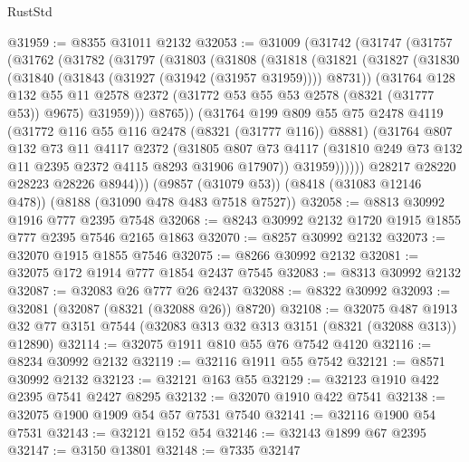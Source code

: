 \begin{lexlean}{RustStd}
\begin{coremodule}
@31959 := @8355 @31011 @2132
@32053 := @31009
    (@31742
      (@31747
        (@31757
          (@31762
            (@31782
              (@31797
                (@31803
                  (@31808
                    (@31818
                      (@31821
                        (@31827
                          (@31830 (@31840 (@31843 (@31927 (@31942 (@31957 @31959)))) @8731))
                          (@31764
                            @128
                            @132
                            @55
                            @11
                            @2578
                            @2372
                            (@31772 @53 @55 @53 @2578 (@8321 (@31777 @53)) @9675)
                            @31959)))
                      @8765))
                  (@31764
                    @199
                    @809
                    @55
                    @75
                    @2478
                    @4119
                    (@31772 @116 @55 @116 @2478 (@8321 (@31777 @116)) @8881)
                    (@31764
                      @807
                      @132
                      @73
                      @11
                      @4117
                      @2372
                      (@31805
                        @807
                        @73
                        @4117
                        (@31810 @249 @73 @132 @11 @2395 @2372 @4115 @8293 @31906 @17907))
                      @31959))))))
          @28217
          @28220
          @28223
          @28226
          @8944)))
    (@9857 (@31079 @53))
    (@8418 (@31083 @12146 @478))
    (@8188 (@31090 @478 @483 @7518 @7527))
@32058 := @8813 @30992 @1916 @777 @2395 @7548
@32068 := @8243 @30992 @2132 @1720 @1915 @1855 @777 @2395 @7546 @2165 @1863
@32070 := @8257 @30992 @2132
@32073 := @32070 @1915 @1855 @7546
@32075 := @8266 @30992 @2132
@32081 := @32075 @172 @1914 @777 @1854 @2437 @7545
@32083 := @8313 @30992 @2132
@32087 := @32083 @26 @777 @26 @2437
@32088 := @8322 @30992
@32093 := @32081 (@32087 (@8321 (@32088 @26)) @8720)
@32108 := @32075
    @487
    @1913
    @32
    @77
    @3151
    @7544
    (@32083 @313 @32 @313 @3151 (@8321 (@32088 @313)) @12890)
@32114 := @32075 @1911 @810 @55 @76 @7542 @4120
@32116 := @8234 @30992 @2132
@32119 := @32116 @1911 @55 @7542
@32121 := @8571 @30992 @2132
@32123 := @32121 @163 @55
@32129 := @32123 @1910 @422 @2395 @7541 @2427 @8295
@32132 := @32070 @1910 @422 @7541
@32138 := @32075 @1900 @1909 @54 @57 @7531 @7540
@32141 := @32116 @1900 @54 @7531
@32143 := @32121 @152 @54
@32146 := @32143 @1899 @67 @2395
@32147 := @3150 @13801
@32148 := @7335 @32147

\end{coremodule}
\end{lexlean}
